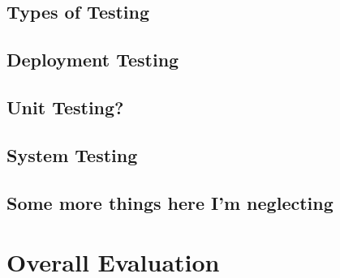 \subsection{Types of Testing}
\subsection{Deployment Testing}
\subsection{Unit Testing?}
\subsection{System Testing}

\subsection{Some more things here I'm neglecting}

\section{Overall Evaluation}
